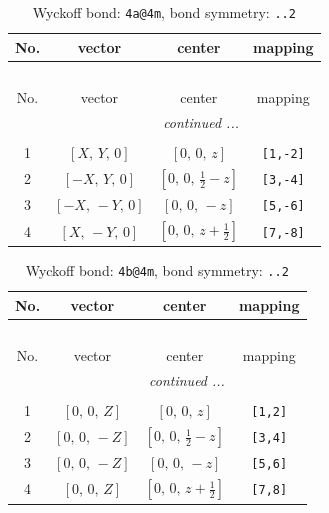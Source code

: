 \documentclass[fleqn,8pt]{jsarticle}
\begin{document}
\begin{longtable}{cccc}
\caption{Wyckoff bond: {\tt 4a@4m}, bond symmetry: {\tt ..2}}
 \\
 \hline \hline
No. & vector & center & mapping \\ \hline \endfirsthead

\multicolumn{3}{l}{\tablename\ \thetable{}} \\
 \hline \hline
No. & vector & center & mapping \\ \hline \endhead

 \hline \hline
\multicolumn{3}{r}{\footnotesize\it continued ...} \\ \endfoot

 \hline \hline
\multicolumn{3}{r}{} \\ \endlastfoot

1 & $\left[ X,\, Y,\, 0 \right]$ & $\left[ 0,\, 0,\, z \right]$ & {\tt [1,-2]} \\ \hline
2 & $\left[ - X,\, Y,\, 0 \right]$ & $\left[ 0,\, 0,\, \frac{1}{2} - z \right]$ & {\tt [3,-4]} \\ \hline
3 & $\left[ - X,\, - Y,\, 0 \right]$ & $\left[ 0,\, 0,\, - z \right]$ & {\tt [5,-6]} \\ \hline
4 & $\left[ X,\, - Y,\, 0 \right]$ & $\left[ 0,\, 0,\, z + \frac{1}{2} \right]$ & {\tt [7,-8]} \\
\end{longtable}
\renewcommand{\arraystretch}{1.2}
\begin{longtable}{cccc}
\caption{Wyckoff bond: {\tt 4b@4m}, bond symmetry: {\tt ..2}}
 \\
 \hline \hline
No. & vector & center & mapping \\ \hline \endfirsthead

\multicolumn{3}{l}{\tablename\ \thetable{}} \\
 \hline \hline
No. & vector & center & mapping \\ \hline \endhead

 \hline \hline
\multicolumn{3}{r}{\footnotesize\it continued ...} \\ \endfoot

 \hline \hline
\multicolumn{3}{r}{} \\ \endlastfoot

1 & $\left[ 0,\, 0,\, Z \right]$ & $\left[ 0,\, 0,\, z \right]$ & {\tt [1,2]} \\ \hline
2 & $\left[ 0,\, 0,\, - Z \right]$ & $\left[ 0,\, 0,\, \frac{1}{2} - z \right]$ & {\tt [3,4]} \\ \hline
3 & $\left[ 0,\, 0,\, - Z \right]$ & $\left[ 0,\, 0,\, - z \right]$ & {\tt [5,6]} \\ \hline
4 & $\left[ 0,\, 0,\, Z \right]$ & $\left[ 0,\, 0,\, z + \frac{1}{2} \right]$ & {\tt [7,8]} \\
\end{longtable}
\end{document}
